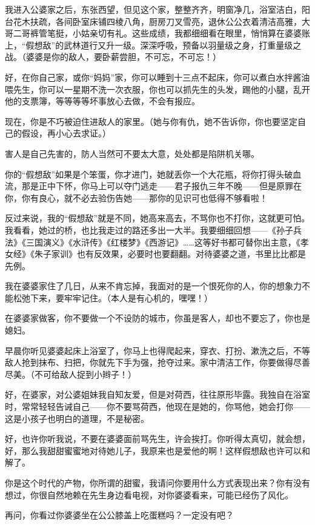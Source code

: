\par 我进入公婆家之后，东张西望，但见这个家，整整齐齐，明窗净几，浴室洁白，阳台花木扶疏，各间卧室床铺四棱八角，厨房刀叉雪亮，退休公公衣着清洁高雅，大哥二哥裤管笔挺，小姑亲切有礼。这些成绩，我都细细看在眼里，悄悄算在婆婆账上，“假想敌”的武林道行又升一级。深深呼吸，预备以羽量级之身，打重量级之战。（婆婆是你的敌人，要卧薪尝胆，不可忘，不可忘！）
\par 好，在你自己家，或你“妈妈”家，你可以睡到十三点不起床，你可以煮白水拌酱油喂先生，你可以一星期不洗一次衣服，你也可以抓先生的头发，踢他的小腿，乱开他的支票簿，等等等等坏事放心去做，不会有报应。
\par 现在，你是不巧被迫住进敌人的家里。（她与你有仇，她不告诉你，你也要坚定自己的假设，再小心去求证。）
\par 害人是自己先害的，防人当然可不要太大意，处处都是陷阱机关哪。
\par 你的“假想敌”如果是个笨蛋，你才进门，她就丢你一个大花瓶，将你打得头破血流，那是正中下怀，你马上可以夺门逃走——君子报仇三年不晚——但是原罪在你，你有良心，就不必去验伤告她——那你的见识可也低得不够看啦！
\par 反过来说，我的“假想敌”就是不同，她高来高去，不骂你也不打你，这就更可怕。我看看，她过的桥，也比我走过的路还多出一大半。我要细细回想——《孙子兵法》《三国演义》《水浒传》《红楼梦》《西游记》……这等好书都可替你出主意，《孝女经》《朱子家训》也有反效果，必要时也要翻翻。对待婆婆之道，书里比比都是先例。
\par 我在婆婆家住了几日，从来不肯忘掉，我面对的是一个恨死你的人，你的想象力不能松弛下来，要牢牢记住。（本人是有心机的，嘿嘿！）
\par 在婆婆家做客，你不要做一个不设防的城市，你虽是客人，却也不要忘了，你也是媳妇。
\par 早晨你听见婆婆起床上浴室了，你马上也得爬起来，穿衣、打扮、漱洗之后，不等敌人抢到抹布、扫把，你就先下手为强，抢夺过来。家中清洁工作，你要做得尽善尽美。（不可给敌人捉到小辫子！）
\par 好，在婆家，对公婆姐妹我自知友爱，但是对荷西，往往原形毕露。我独自在浴室时，常常轻轻告诫自己——你不要骂荷西，他现在是她的，你骂他，她会打你——这是小孩子也明白的道理，不是秘密。
\par 好，也许你听我说，不要在婆婆面前骂先生，许会挨打。你听得太真切，就会想，好，那么我甜甜蜜蜜地对待她儿子，我原来也是爱他的啊！这样假想敌也许可以和解了。
\par 你是这个时代的产物，你所谓的甜蜜，我请问你要用什么方式表现出来？你有没有想过，你很自然地赖在先生身边看电视，对你婆婆看来，可能已经伤了风化。
\par 再问，你看过你婆婆坐在公公膝盖上吃蛋糕吗？一定没有吧？
